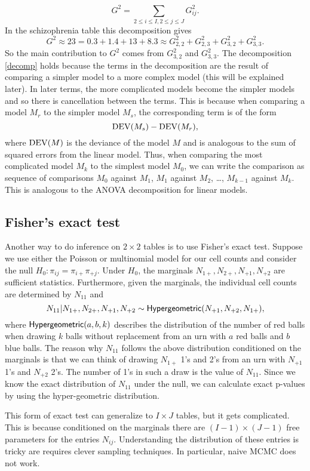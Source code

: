 \begin{equation}\label{decomp} G^2 = \sum_{2\le i \le I, 2\le j \le J} G_{ij}^2. \end{equation}
In the schizophrenia table this decomposition gives
\[G^2 \approx 23 = 0.3+1.4+13+8.3 \approx G_{2,2}^2+G_{2,3}^2+G_{3,2}^2+G_{3,3}^2. \]
So the main contribution to $G^2$ comes from $G_{3,2}^2$ and $G_{3,3}^2$.  The decomposition \eqref{decomp} holds because the terms in the decomposition are the result of comparing a simpler model to a more complex model (this will be explained later). In later terms, the more complicated models become the simpler models and so there is cancellation between the terms. This is because when comparing a model $M_r$ to the simpler model $M_s$, the corresponding term is of the form
\[\operatorname{DEV}(M_s)-\operatorname{DEV}(M_r),\]
where $\operatorname{DEV}(M)$ is the deviance of the model $M$ and is analogous to the sum of squared errors from the linear model. Thus, when comparing the most complicated model $M_k$ to the simplest model $M_0$, we can write the comparison as sequence of comparisons $M_0$ against $M_1$, $M_1$ against $M_2$, \ldots, $M_{k-1}$ against $M_k$. This is analogous to the ANOVA decomposition for linear models.
\subsection{Fisher's exact test}
Another way to do inference on $2 \times 2$ tables is to use Fisher's exact test. Suppose we use either the Poisson or multinomial model for our cell counts and consider the null $H_0 : \pi_{ij} = \pi_{i+}\pi_{+j}$. Under $H_0$, the marginals $N_{1+}, N_{2+}, N_{+1}, N_{+2}$ are sufficient statistics. Furthermore, given the marginals, the individual cell counts are determined by $N_{11}$ and 
\[N_{11}|N_{1+}, N_{2+}, N_{+1}, N_{+2} \sim \mathsf{Hypergeometric}(N_{+1}, N_{+2}, N_{1+}), \]
where $\mathsf{Hypergeometric}(a,b,k)$ describes the distribution of the number of red balls when drawing $k$ balls without replacement from an urn with $a$ red balls and $b$ blue balls. The reason why $N_{11}$ follows the above distribution conditioned on the marginals is that we can think of drawing $N_{1+}$ 1's and 2's from an urn with $N_{+1}$ 1's and $N_{+2}$ 2's. The number of 1's in such a draw is the value of $N_{11}$. Since we know the exact distribution of $N_{11}$ under the null, we can calculate exact p-values by using the hyper-geometric distribution.

This form of exact test can generalize to $I \times J$ tables, but it gets complicated. This is because conditioned on the marginals there are $(I-1)\times(J-1)$ free parameters for the entries $N_{ij}$. Understanding the distribution of these entries is tricky are requires clever sampling techniques. In particular, naive MCMC does not work.
